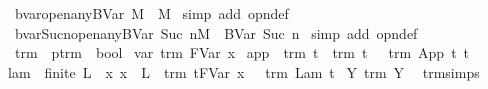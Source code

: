 \begin{isabellebody}
\isanewline
{}\isamarkupfalse%
\ bvar{\isacharunderscore}{}{\isacharunderscore}open{\isacharunderscore}any{\isacharcolon}{\isachardoublequoteopen}BVar\ {}{\isacharcircum}M\ {\isacharequal}\ M{\isachardoublequoteclose}\isanewline
%
\isadelimproof
%
\endisadelimproof
%
\isatagproof
{}\isamarkupfalse%
\ {\isacharparenleft}simp\ add{\isacharcolon}\ opn{\isacharprime}{\isacharunderscore}def{\isacharparenright}%
\endisatagproof
{\isafoldproof}%
%
\isadelimproof
\isanewline
%
\endisadelimproof
\isanewline
{}\isamarkupfalse%
\ bvar{\isacharunderscore}Suc{\isacharunderscore}n{\isacharunderscore}open{\isacharunderscore}any{\isacharcolon}{\isachardoublequoteopen}{\isacharparenleft}BVar\ {\isacharparenleft}Suc\ n{\isacharparenright}{\isacharparenright}{\isacharcircum}M\ {\isacharequal}\ BVar\ {\isacharparenleft}Suc\ n{\isacharparenright}{\isachardoublequoteclose}\isanewline
%
\isadelimproof
%
\endisadelimproof
%
\isatagproof
{}\isamarkupfalse%
\ {\isacharparenleft}simp\ add{\isacharcolon}\ opn{\isacharprime}{\isacharunderscore}def{\isacharparenright}%
\endisatagproof
{\isafoldproof}%
%
\isadelimproof
%
\endisadelimproof
%
\isamarkuptrue%
\isamarkupfalse%
\ trm\ {\isacharcolon}{\isacharcolon}\ {\isachardoublequoteopen}ptrm\ {\isasymRightarrow}\ bool{\isachardoublequoteclose}\ \isanewline
var{\isacharcolon}\ {\isachardoublequoteopen}trm\ {\isacharparenleft}FVar\ x{\isacharparenright}{\isachardoublequoteclose}\ {\isacharbar}\isanewline
app{\isacharcolon}\ {\isachardoublequoteopen}{\isasymlbrakk}\ trm\ t{}\ {\isacharsemicolon}\ trm\ t{}\ {\isasymrbrakk}\ {\isasymLongrightarrow}\ trm\ {\isacharparenleft}App\ t{}\ t{}{\isacharparenright}{\isachardoublequoteclose}\ {\isacharbar}\isanewline
lam{\isacharcolon}\ {\isachardoublequoteopen}{\isasymlbrakk}\ finite\ L\ {\isacharsemicolon}\ {\isacharparenleft}{\isasymAnd}x{\isachardot}\ x\ {\isasymnotin}\ L\ {\isasymLongrightarrow}\ trm\ {\isacharparenleft}t{\isacharcircum}{\isacharparenleft}FVar\ x{\isacharparenright}{\isacharparenright}{\isacharparenright}\ {\isasymrbrakk}\ {\isasymLongrightarrow}\ trm\ {\isacharparenleft}Lam\ t{\isacharparenright}{\isachardoublequoteclose}\ {\isacharbar}\isanewline
Y{\isacharcolon}\ {\isachardoublequoteopen}trm\ {\isacharparenleft}Y\ {\isasymsigma}{\isacharparenright}{\isachardoublequoteclose}\isanewline
{}\isamarkupfalse%
\ trm{\isachardot}simps\isanewline
\isanewline

\end{isabellebody}
